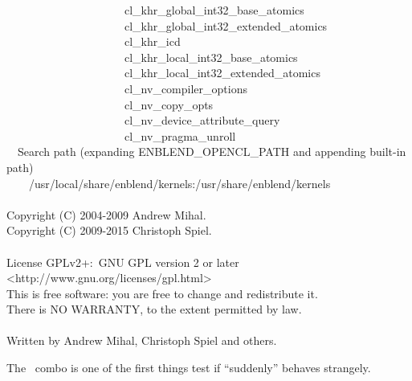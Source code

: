 \begin{exemplar}
\begin{maxipage}
\begin{terminal}
        ~~~~~~~~~~~~~~~~~~~~~cl\_khr\_global\_int32\_base\_atomics \\
        ~~~~~~~~~~~~~~~~~~~~~cl\_khr\_global\_int32\_extended\_atomics \\
        ~~~~~~~~~~~~~~~~~~~~~cl\_khr\_icd \\
        ~~~~~~~~~~~~~~~~~~~~~cl\_khr\_local\_int32\_base\_atomics \\
        ~~~~~~~~~~~~~~~~~~~~~cl\_khr\_local\_int32\_extended\_atomics \\
        ~~~~~~~~~~~~~~~~~~~~~cl\_nv\_compiler\_options \\
        ~~~~~~~~~~~~~~~~~~~~~cl\_nv\_copy\_opts \\
        ~~~~~~~~~~~~~~~~~~~~~cl\_nv\_device\_attribute\_query \\
        ~~~~~~~~~~~~~~~~~~~~~cl\_nv\_pragma\_unroll \\
        ~~Search path (expanding ENBLEND\_OPENCL\_PATH and appending built-in path) \\
        ~~~~/usr/local/share/enblend/kernels:/usr/share/enblend/kernels \\
        ~ \\
        Copyright (C) 2004-2009 Andrew Mihal. \\
        Copyright (C) 2009-2015 Christoph Spiel. \\
        ~ \\
        License GPLv2+:~GNU GPL version 2 or later <http://www.gnu.org/licenses/gpl.html> \\
        This is free software: you are free to change and redistribute it. \\
        There is NO WARRANTY, to the extent permitted by law. \\
        ~ \\
        Written by Andrew Mihal, Christoph Spiel and others.
    \end{terminal}
  \end{maxipage}

  \caption[Output of ]%
          {\label{ex:option-version-verbose}%
            Example output of \appcmd{} when called with options 
            and~ together.}
\end{exemplar}

The ~combo is one of the first things test if \appcmd{} ``suddenly''
behaves strangely.

